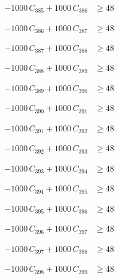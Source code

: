 \documentclass[a4paper,11pt]{article}
\begin{document}
\begin{align}
-1000\,C_{385} + 1000\,C_{386} &\geq 48 \nonumber
\end{align}

\begin{align}
-1000\,C_{386} + 1000\,C_{387} &\geq 48 \nonumber
\end{align}

\begin{align}
-1000\,C_{387} + 1000\,C_{388} &\geq 48 \nonumber
\end{align}

\begin{align}
-1000\,C_{388} + 1000\,C_{389} &\geq 48 \nonumber
\end{align}

\begin{align}
-1000\,C_{389} + 1000\,C_{390} &\geq 48 \nonumber
\end{align}

\begin{align}
-1000\,C_{390} + 1000\,C_{391} &\geq 48 \nonumber
\end{align}

\begin{align}
-1000\,C_{391} + 1000\,C_{392} &\geq 48 \nonumber
\end{align}

\begin{align}
-1000\,C_{392} + 1000\,C_{393} &\geq 48 \nonumber
\end{align}

\begin{align}
-1000\,C_{393} + 1000\,C_{394} &\geq 48 \nonumber
\end{align}

\begin{align}
-1000\,C_{394} + 1000\,C_{395} &\geq 48 \nonumber
\end{align}

\begin{align}
-1000\,C_{395} + 1000\,C_{396} &\geq 48 \nonumber
\end{align}

\begin{align}
-1000\,C_{396} + 1000\,C_{397} &\geq 48 \nonumber
\end{align}

\begin{align}
-1000\,C_{397} + 1000\,C_{398} &\geq 48 \nonumber
\end{align}

\begin{align}
-1000\,C_{398} + 1000\,C_{399} &\geq 48 \nonumber
\end{align}
\end{document}
